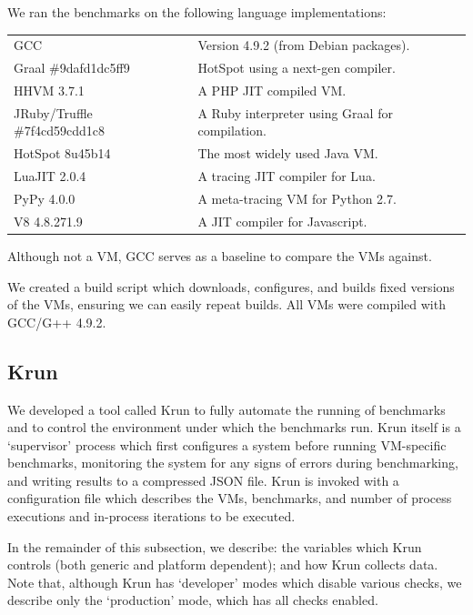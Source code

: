 \documentclass[a4paper,UKenglish]{lipics}
\newcommand{\krun}{Krun\xspace}
\begin{document}
We ran the benchmarks on the following language implementations:

\begin{tabular}{ll}
GCC & Version 4.9.2 (from Debian packages). \\
Graal \#9dafd1dc5ff9 & HotSpot using a next-gen compiler. \\
HHVM 3.7.1 & A PHP JIT compiled VM. \\
JRuby/Truffle \#7f4cd59cdd1c8 & A Ruby interpreter using Graal for compilation. \\
HotSpot 8u45b14 & The most widely used Java VM. \\
LuaJIT 2.0.4 & A tracing JIT compiler for Lua. \\
PyPy 4.0.0 & A meta-tracing VM for Python 2.7. \\
V8 4.8.271.9 & A JIT compiler for Javascript.
\end{tabular}
%

\noindent Although not a VM, GCC serves as a baseline to compare the VMs against.

We created a build script which downloads, configures, and builds fixed
versions of the
VMs, ensuring we can easily repeat builds.
All VMs were compiled with GCC/G++ 4.9.2.


\subsection{\krun}
\label{krun}

We developed a tool called \krun to fully automate the running of benchmarks
and to control the environment under which the benchmarks run. \krun itself is a
`supervisor' process which first configures a system before running VM-specific
benchmarks, monitoring the system for any signs of errors during benchmarking,
and writing results to a compressed JSON file. \krun is invoked with a
configuration file which describes the VMs, benchmarks, and number of process
executions and in-process iterations to
be executed.

In the remainder of this subsection, we describe: the variables which \krun
controls (both generic and platform dependent); and how \krun collects data.
Note that, although \krun has `developer' modes which disable various checks,
we describe only the `production' mode, which has all checks enabled.
\end{document}
